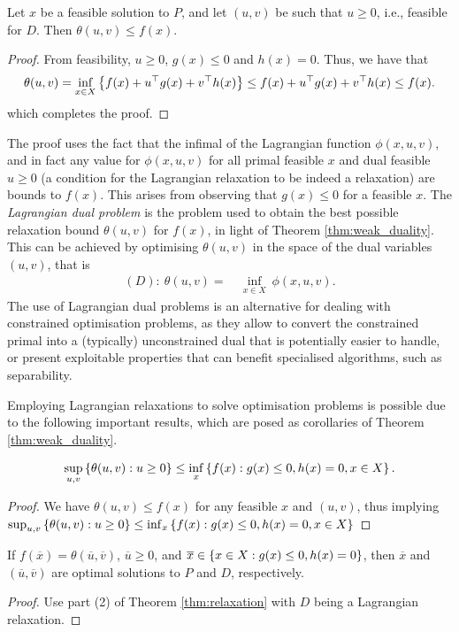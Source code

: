 %
\begin{theorem}  \label{thm:weak_duality}
	Let $x$ be a feasible solution to $P$, and let $(u,v)$ be such that $u \geq 0$, i.e., feasible for $D$. Then $\theta(u,v) \leq f(x)$.  
\end{theorem}
%
\begin{proof}
	From feasibility, $u \geq 0$, $g(x) \leq 0$ and $h(x)=0$. Thus, we have that
	$$
	\theta(u,v) = \inf_{x \in X} \left\{ f(x) + u^\top g(x) + v^\top h(x) \right \} \leq f(x) + u^\top g(x) + v^\top h(x) \leq f(x).
	$$
	which completes the proof.
\end{proof}
%
The proof uses the fact that the infimal of the Lagrangian function $\phi(x,u,v)$, and in fact any value for $\phi(x,u,v)$ for all primal feasible $x$ and dual feasible $u \geq 0$ (a condition for the Lagrangian relaxation to be indeed a relaxation) are bounds to $f(x)$. This arises from observing that $g(x) \leq 0$ for a feasible $x$.
%
The \emph{Lagrangian dual problem} is the problem used to obtain the best possible relaxation bound $\theta(u,v)$ for $f(x)$, in light of Theorem \ref{thm:weak_duality}. This can be achieved by optimising $\theta(u,v)$ in the space of the dual variables $(u,v)$, that is 
%
\begin{align*}
	(D) :~ \theta(u,v) = \ &\inf_{x \in X} \ \phi(x,u,v).
\end{align*}
%
The use of Lagrangian dual problems is an alternative for dealing with constrained optimisation problems, as they allow to convert the constrained primal into a (typically) unconstrained dual that is potentially easier to handle, or present exploitable properties that can benefit specialised algorithms, such as separability.

Employing Lagrangian relaxations to solve optimisation problems is possible due to the following important results, which are posed as corollaries of Theorem \ref{thm:weak_duality}.
%
\begin{corollary}  \label{cor:weak_duals}
	$$
	\sup_{u,v}\left\{ \theta(u,v) : u \geq 0 \right \} \leq \inf_{x} \left\{ f(x) : g(x) \leq 0, h(x) = 0, x \in X \right \}.
	$$
\end{corollary} 
%
\begin{proof}
	We have $\theta(u,v) \leq f(x)$ for any feasible $x$ and $(u,v)$, thus implying $\sup_{u,v}\left\{ \theta(u,v) : u \geq 0 \right \} \leq \inf_{x} \left\{ f(x) : g(x) \leq 0, h(x) = 0, x \in X \right \}$
\end{proof}
%
\begin{corollary} \label{cor:strong_duals_1}
	If $f(\overline{x}) = \theta(\overline{u},\overline{v})$, $\overline{u} \geq 0$, and $\overline{x} \in \left\{ x \in X : g(x) \leq 0, h(x) = 0 \right \}$, then $\overline{x}$ and $(\overline{u},\overline{v})$ are optimal solutions to $P$ and $D$, respectively.
\end{corollary}
%
\begin{proof}
	Use part (2) of Theorem \ref{thm:relaxation} with $D$ being a Lagrangian relaxation.
\end{proof} 

